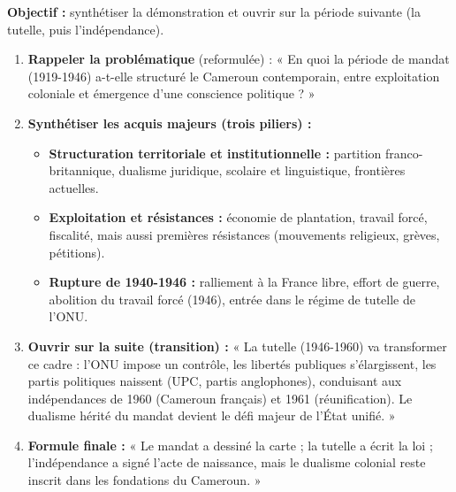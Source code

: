 \documentclass[11pt]{article}
\begin{document}
\begin{methode}
\textbf{Objectif :} synthétiser la démonstration et ouvrir sur la période suivante (la tutelle, puis l'indépendance).
\begin{enumerate}
\item \textbf{Rappeler la problématique} (reformulée) : « En quoi la période de mandat (1919-1946) a-t-elle structuré le Cameroun contemporain, entre exploitation coloniale et émergence d'une conscience politique ? »
\item \textbf{Synthétiser les acquis majeurs (trois piliers) :}
  \begin{itemize}
  \item \textbf{Structuration territoriale et institutionnelle :} partition franco-britannique, dualisme juridique, scolaire et linguistique, frontières actuelles.
  \item \textbf{Exploitation et résistances :} économie de plantation, travail forcé, fiscalité, mais aussi premières résistances (mouvements religieux, grèves, pétitions).
  \item \textbf{Rupture de 1940-1946 :} ralliement à la France libre, effort de guerre, abolition du travail forcé (1946), entrée dans le régime de tutelle de l'ONU.
  \end{itemize}
\item \textbf{Ouvrir sur la suite (transition) :} « La tutelle (1946-1960) va transformer ce cadre : l'ONU impose un contrôle, les libertés publiques s'élargissent, les partis politiques naissent (UPC, partis anglophones), conduisant aux indépendances de 1960 (Cameroun français) et 1961 (réunification). Le dualisme hérité du mandat devient le défi majeur de l'État unifié. »
\item \textbf{Formule finale :} « Le mandat a dessiné la carte ; la tutelle a écrit la loi ; l'indépendance a signé l'acte de naissance, mais le dualisme colonial reste inscrit dans les fondations du Cameroun. »
\end{enumerate}
\end{methode}
\end{document}
